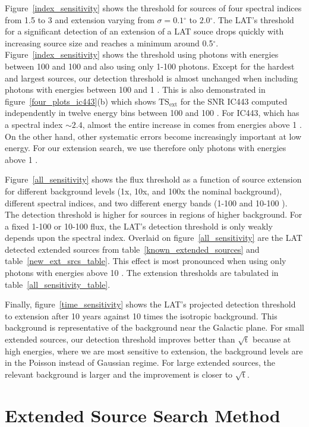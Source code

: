 \documentclass[12pt,preprint]{aastex}
\newcommand{\mev}{\text{MeV}\xspace}
\newcommand{\gev}{\text{GeV}\xspace}
\newcommand{\tsext}{{\ensuremath{\text{TS}_{\text{ext}}}}\xspace}
\newcommand{\ts}{\text{TS}\xspace}
\renewcommand{\deg}{\ensuremath{^\circ}\xspace}
\renewcommand{\approx}{\sim\!\xspace}
\begin{document}
Figure~\ref{index_sensitivity} shows the threshold for sources of four
spectral indices from 1.5 to 3 and extension varying from $\sigma=0.1\deg$
to $2.0\deg$.  The LAT's threshold for a significant detection
of an extension of a LAT souce drops quickly with
increasing source size and reaches a minimum around 0.5\deg. 
Figure~\ref{index_sensitivity} shows
the threshold using photons with energies between 100 \mev and 100 \gev
and also using only 1-100\gev photons.
Except for the hardest and largest sources, our detection threshold is
almost unchanged when including photons with energies between 100 \mev and
1 \gev.  This is also demonstrated in figure~\ref{four_plots_ic443}(b)
which shows \tsext for the SNR IC443 computed independently in twelve
energy bins between 100 \mev and 100 \gev. For IC443, which has a
spectral index $\approx2.4$, almost the entire increase in \ts comes
from energies above 1 \gev.  On the other hand, other systematic errors
become increasingly important at low energy. For our extension search,
we use therefore only photons with energies above 1 \gev.

Figure~\ref{all_sensitivity}
shows the flux threshold as a function of source extension for
different background levels (1x, 10x, and 100x the
nominal background), different spectral indices, and two
different energy bands (1-100 \gev and 10-100 \gev).
The detection threshold is higher for sources in regions
of higher background.
For a fixed 1-100 \gev or 10-100 \gev
flux, the LAT's detection threshold is only weakly depends upon the
spectral index.  
Overlaid on figure~\ref{all_sensitivity} are the LAT
detected extended sources from table~\ref{known_extended_sources} and
table~\ref{new_ext_srcs_table}.  
This effect is most pronounced when using only photons
with energies above 10 \gev. The extension thresholds are tabulated in
table~\ref{all_sensitivity_table}.

Finally, figure~\ref{time_sensitivity} shows the LAT's projected detection
threshold to extension after 10 years against 10 times the isotropic
background. This background is representative of the background near
the Galactic plane.  For small extended sources, our detection threshold
improves better than $\sqrt{\text{t}}$ because at high energies, where we
are most sensitive to extension, the background levels are in the Poisson
instead of Gaussian regime.  For large extended sources, the relevant
background is larger and the improvement is closer to $\sqrt{\text{t}}$.


\section{Extended Source Search Method}
\label{extended_source_search_method}
\end{document}
